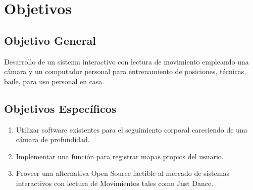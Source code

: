 \chapter{Objetivos}


\section{Objetivo General}

Desarrollo de un sistema interactivo con lectura de movimiento empleando una cámara y un computador personal para entrenamiento de posiciones, técnicas, baile, para uso personal en casa.

\section{Objetivos Específicos}

\begin{enumerate}
	\item Utilizar software existentes para el seguimiento corporal careciendo de una cámara de profundidad.
	\item Implementar una función para registrar mapas propios del usuario.
	\item Proveer una alternativa Open Source factible al mercado de sistemas interactivos con lectura de Movimientos tales como Just Dance.
\end{enumerate}

